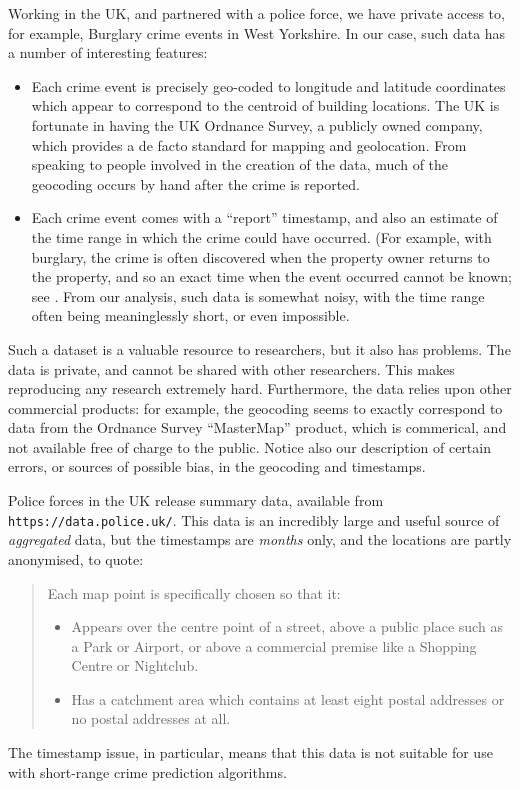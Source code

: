 \documentclass[twoside,a4paper,twocolumn,10pt]{article}
\theoremstyle{plain}
\theoremstyle{definition}
\begin{document}
Working in the UK, and partnered with a police force, we have private access to,
for example, Burglary crime events in West Yorkshire.  In our case, such data has a
number of interesting features:
\begin{itemize}
\item Each crime event is precisely geo-coded to longitude and latitude coordinates
  which appear to correspond to the centroid of building locations.  The UK is fortunate
  in having the UK Ordnance Survey, a publicly owned company, which provides a de facto
  standard for mapping and geolocation.  From speaking to people involved in the creation
  of the data, much of the geocoding occurs by hand after the crime is reported.
\item Each crime event comes with a ``report'' timestamp, and also an estimate of the
  time range in which the crime could have occurred.  (For example, with burglary, the
  crime is often discovered when the property owner returns to the property, and so an
  exact time when the event occurred cannot be known; see \cite{ratcliffe}.
  From our analysis, such data is somewhat noisy, with the time range often being meaninglessly
  short, or even impossible.
\end{itemize}
Such a dataset is a valuable resource to researchers, but it also has problems.  The data
is private, and cannot be shared with other researchers.  This makes reproducing any
research extremely hard.  Furthermore, the data relies upon other
commercial products: for example, the geocoding seems to exactly correspond to data
from the Ordnance Survey ``MasterMap'' product, which is commerical, and not available
free of charge to the public.  Notice also our description of certain errors, or sources of
possible bias, in the geocoding and timestamps.

Police forces in the UK release summary data, available from \texttt{https://data.police.uk/}.
This data is an incredibly large and useful source of \emph{aggregated} data, but the timestamps
are \emph{months} only, and the locations are partly anonymised, to quote:
\begin{quote}
Each map point is specifically chosen so that it:
\begin{itemize}
\item Appears over the centre point of a street, above a public place such as a Park or Airport, or
  above a commercial premise like a Shopping Centre or Nightclub.
\item Has a catchment area which contains at least eight postal addresses or no postal addresses at all.
\end{itemize}
\end{quote}
The timestamp issue, in particular, means that this data is not suitable for use with
short-range crime prediction algorithms.
\end{document}
